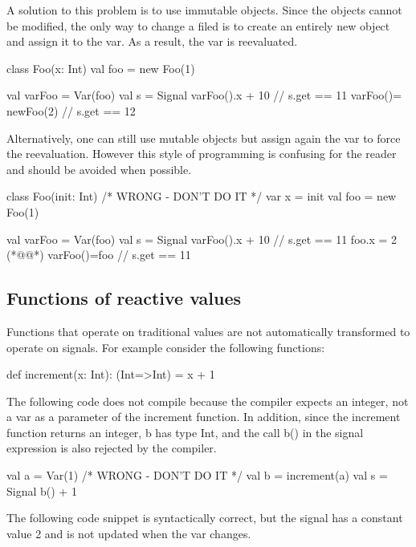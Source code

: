 \documentclass[10pt,a4paper]{article}
\newcommand{\code}[1]{{\fontfamily{cmtt}\small\selectfont#1}}
\begin{document}
A solution to this problem is to use immutable objects. Since the
objects cannot be modified, the only way to change a filed is to
create an entirely new object and assign it to the var. As a result,
the var is reevaluated.

\begin{codenv}
class Foo(x: Int){}
val foo = new Foo(1)

val varFoo = Var(foo)
val s = Signal{ varFoo().x + 10 }
// s.get == 11
varFoo()= newFoo(2)
// s.get == 12
\end{codenv}

Alternatively, one can still use mutable objects but assign again the
var to force the reevaluation. However this style of programming is
confusing for the reader and should be avoided when possible.

\begin{codenv}
class Foo(init: Int){   /* WRONG - DON'T DO IT */
  var x = init
}
val foo = new Foo(1)

val varFoo = Var(foo)
val s = Signal{ varFoo().x + 10 }
// s.get == 11
foo.x = 2 (*@\label{same}@*)
varFoo()=foo
// s.get == 11
\end{codenv}


\subsection{Functions of reactive values} Functions that operate on
traditional values are not automatically transformed to operate on
signals. For example consider the following functions:

\begin{codenv}
def increment(x: Int): (Int=>Int) = x + 1
\end{codenv}

The following code does not compile because the compiler expects an
integer, not a var as a parameter of the \code{increment} function. In
addition, since the \code{increment} function returns an integer,
\code{b} has type \code{Int}, and the call \code{b()} in the signal
expression is also rejected by the compiler.

\begin{codenv}
val a = Var(1)           /* WRONG - DON'T DO IT */
val b = increment(a)
val s = Signal{ b() + 1 }
\end{codenv}

The following code snippet is syntactically correct, but the signal
has a constant value 2 and is not updated when the var changes.
\end{document}
